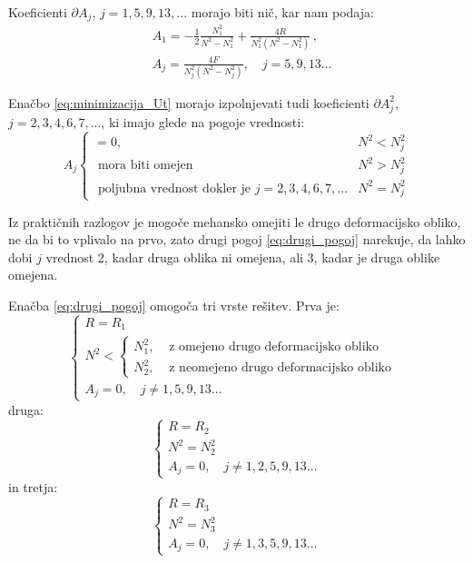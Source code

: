         Koeficienti $\partial A_j$, $j=1, 5, 9, 13, ...$ morajo biti nič, kar nam podaja:  
        \begin{align}
        &A_1=-\frac{1}{2} \frac{N_1^2}{N^2-N_1^2}+\frac{4 R}{N_1^2\left(N^2-N_1^2\right)} \, ,\\
        &A_j=\frac{4 F}{N_j^2\left(N^2-N_j^2\right)}, \quad j = 5, 9, 13 \ldots \label{eq:Aj_pogoj}
        \end{align}
        
        Enačbo \eqref{eq:minimizacija_Ut} morajo izpolnjevati tudi koeficienti $\partial A_j^2$, $j=2, 3, 4, 6, 7, ...$, ki imajo glede na pogoje vrednosti:
        \begin{equation}\label{eq:drugi_pogoj}
        A_j \begin{cases}=0, & N^2<N_j^2 \\ \text { mora biti omejen} & N^2>N_j^2 \\ \text { poljubna vrednost dokler je } j=2, 3, 4, 6, 7, ... & N^2=N_j^2 \end{cases}
        \end{equation}
        
        \newpage
        Iz praktičnih razlogov je mogoče mehansko omejiti le drugo deformacijsko obliko, ne da bi to vplivalo na prvo, zato drugi pogoj \eqref{eq:drugi_pogoj} narekuje, da lahko dobi $j$ vrednost 2, kadar druga oblika ni omejena, ali 3, kadar je druga oblike omejena. 
        
        Enačba \eqref{eq:drugi_pogoj} omogoča tri vrste rešitev. Prva je:
        \begin{equation}
            \left\{\begin{array}{l}
            R=R_1 \\
            N^2<\left\{\begin{aligned}
            N_1^2, & \text { z omejeno drugo deformacijsko obliko } \\
            N_2^2, & \text { z neomejeno drugo deformacijsko obliko }
            \end{aligned}\right. \\
            A_j=0, \quad j \neq 1, 5, 9, 13 \ldots
            \end{array}\right.
        \end{equation}
        druga:
        \begin{equation}
            \left\{\begin{array}{l}
            R=R_2 \\
            N^2=N_2^2 \\
            A_j=0, \quad j \neq 1, 2, 5, 9, 13 \ldots
            \end{array}\right.
        \end{equation}
        in tretja:
        \begin{equation}
            \left\{\begin{array}{l}
            R=R_3 \\
            N^2=N_3^2 \\
            A_j=0, \quad j \neq 1, 3, 5, 9, 13 \ldots
            \end{array}\right.
        \end{equation}
        
